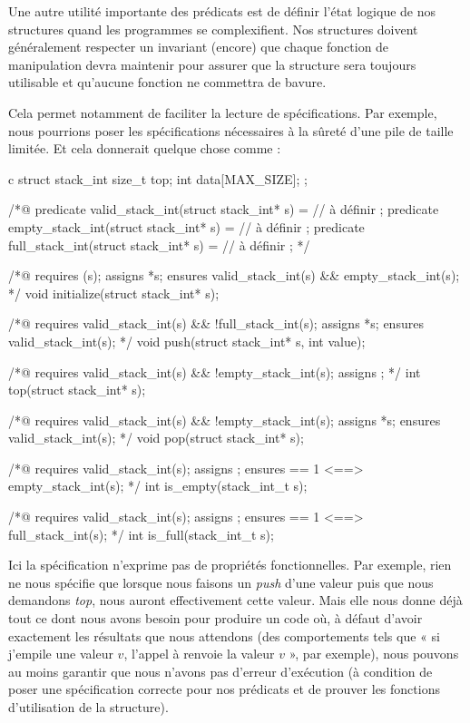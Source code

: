 

Une autre utilité importante des prédicats est de définir l'état logique de nos
structures quand les programmes se complexifient. Nos structures doivent 
généralement respecter un invariant (encore) que chaque fonction de manipulation
devra maintenir pour assurer que la structure sera toujours utilisable et 
qu'aucune fonction ne commettra de bavure.



Cela permet notamment de faciliter la lecture de spécifications. Par exemple, nous
pourrions poser les spécifications nécessaires à la sûreté d'une pile de taille 
limitée. Et cela donnerait quelque chose comme :



\begin{CodeBlock}{c}
struct stack_int{
  size_t top;
  int    data[MAX_SIZE];
};

/*@
  predicate valid_stack_int(struct stack_int* s) = // à définir ;
  predicate empty_stack_int(struct stack_int* s) = // à définir ;
  predicate full_stack_int(struct stack_int* s) =  // à définir ;
*/

/*@
  requires \valid(s);
  assigns *s;
  ensures valid_stack_int(s) && empty_stack_int(s);
*/
void initialize(struct stack_int* s);

/*@
  requires valid_stack_int(s) && !full_stack_int(s);
  assigns  *s;
  ensures valid_stack_int(s);
*/
void push(struct stack_int* s, int value);

/*@
  requires valid_stack_int(s) && !empty_stack_int(s);
  assigns \nothing;
*/
int  top(struct stack_int* s);

/*@
  requires valid_stack_int(s) && !empty_stack_int(s);
  assigns *s;
  ensures valid_stack_int(s);
*/
void pop(struct stack_int* s);

/*@
  requires valid_stack_int(s);
  assigns \nothing;
  ensures \result == 1 <==> empty_stack_int(s);
*/
int  is_empty(stack_int_t s);


/*@
  requires valid_stack_int(s);
  assigns \nothing;
  ensures \result == 1 <==> full_stack_int(s);
*/
int  is_full(stack_int_t s);
\end{CodeBlock}



Ici la spécification n'exprime pas de propriétés fonctionnelles. Par exemple, 
rien ne nous spécifie que lorsque nous faisons un \textit{push} d'une valeur puis que nous
demandons \textit{top}, nous auront effectivement cette valeur. Mais elle nous donne 
déjà tout ce dont nous avons besoin pour produire un code où, à défaut d'avoir 
exactement les résultats que nous attendons (des comportements tels que « si 
j'empile une valeur $v$, l'appel à  renvoie la valeur $v$ », par exemple), nous
 pouvons au moins garantir que nous n'avons pas d'erreur d'exécution (à condition 
de poser une spécification correcte pour nos prédicats et de prouver les fonctions 
d'utilisation de la structure).
